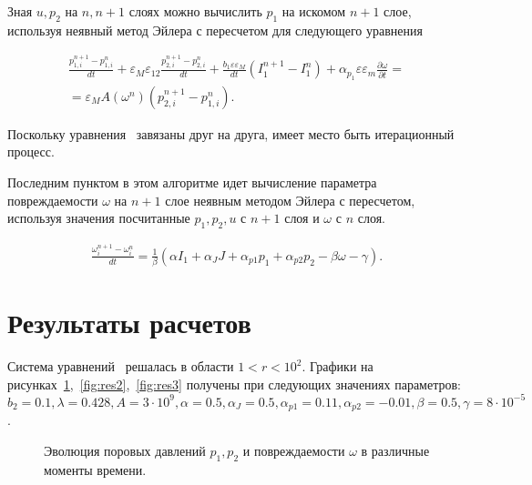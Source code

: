 Зная $u, p_2$ на $n, n+1$ слоях можно вычислить $p_1$ на искомом $n+1$ слое, используя неявный метод Эйлера с пересчетом для следующего уравнения

\begin{equation}
 \label{eq:approxp1}
   \begin{multlined}
     \frac{p_{1, i}^{n+1} - p_{1, i}^n}{dt} + \varepsilon_M \varepsilon_{12} \frac{p_{2,i}^{n+1} - p_{2,i}^n}{dt} +
     \frac{b_1 \varepsilon \varepsilon_M}{dt} (I_1^{n+1} - I_1^{n}) + \alpha_{p_1} \varepsilon \varepsilon_m \frac{\partial \omega}{\partial t} =
     \\
     =\varepsilon_M A(\omega^n) (p_{2,i}^{n+1} - p_{1,i}^n).
   \end{multlined}
\end{equation}

Поскольку уравнения~ завязаны друг на друга, имеет место быть итерационный процесс.

Последним пунктом в этом алгоритме идет вычисление параметра повреждаемости $\omega$ на $n+1$ слое неявным методом Эйлера с пересчетом, используя значения посчитанные $p_1, p_2, u$ с $n+1$ слоя и $\omega$ с $n$ слоя.

\begin{equation}
 \label{eq:approxpw}
   \begin{multlined}
     \frac{\omega_{i}^{n+1} - \omega_{i}^n}{dt} = \frac{1}{\beta} (\alpha I_1 + \alpha_J J  + \alpha_{p1} p_1 + \alpha_{p2} p_2 - \beta \omega - \gamma).
   \end{multlined}
\end{equation}

\section{Результаты расчетов}\label{sec:ch3/sect4}

Система уравнений~ решалась в области $1 < r < 10^2$. Графики на рисунках~\ref{fig:res1},~\ref{fig:res2},~\ref{fig:res3} получены при следующих значениях параметров: $b_2 = 0.1, \lambda = 0.428, A = 3 \cdot 10^9, \alpha =0.5, \alpha_J = 0.5, \alpha_{p1} = 0.11, \alpha_{p2} = -0.01, \beta = 0.5, \gamma = 8 \cdot 10^{-5}$.

\begin{figure}[ht]
  \caption{Эволюция поровых давлений $p_1, p_2$ и повреждаемости $\omega$ в различные моменты времени.}
  \label{fig:res1}
\end{figure}

